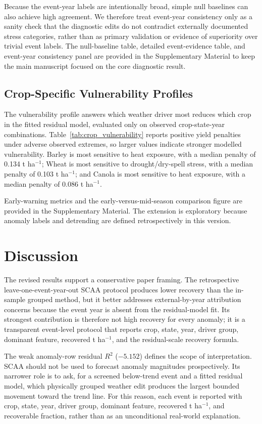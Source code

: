 \documentclass[11pt]{article}
\begin{document}
Because the event-year labels are intentionally broad, simple null baselines can also
achieve high agreement. We therefore treat event-year consistency only as a sanity
check that the diagnostic edits do not contradict externally documented stress
categories, rather than as primary validation or evidence of superiority over trivial
event labels. The null-baseline table, detailed event-evidence table, and event-year
consistency panel are provided in the Supplementary Material to keep the main
manuscript focused on the core diagnostic result.

\subsection{Crop-Specific Vulnerability Profiles}
The vulnerability profile answers which weather driver most reduces which crop in the
fitted residual model, evaluated only on observed crop-state-year combinations.
Table~\ref{tab:crop_vulnerability} reports positive yield penalties under adverse
observed extremes, so larger values indicate stronger modelled vulnerability. Barley
is most sensitive to heat exposure, with a median penalty of 0.134 t ha$^{-1}$; Wheat
is most sensitive to drought/dry-spell stress, with a median penalty of 0.103
t ha$^{-1}$; and Canola is most sensitive to heat exposure, with a median penalty of
0.086 t ha$^{-1}$.



Early-warning metrics and the early-versus-mid-season comparison figure are provided
in the Supplementary Material. The extension is exploratory because anomaly labels
and detrending are defined retrospectively in this version.

\section{Discussion}
The revised results support a conservative paper framing. The retrospective
leave-one-event-year-out SCAA protocol produces lower recovery than the in-sample
grouped method, but it better addresses external-by-year attribution concerns because
the event year is absent from the residual-model fit. Its strongest contribution is
therefore not high recovery for every anomaly; it is a transparent event-level protocol
that reports crop, state, year, driver group, dominant feature, recovered t ha$^{-1}$,
and the residual-scale recovery formula.

The weak anomaly-row residual $R^2$ ($-5.152$) defines the scope of interpretation.
SCAA should not be used to forecast anomaly magnitudes prospectively. Its narrower
role is to ask, for a screened below-trend event and a fitted residual model, which
physically grouped weather edit produces the largest bounded movement toward the
trend line. For this reason, each event is reported with crop, state, year, driver
group, dominant feature, recovered t ha$^{-1}$, and recoverable fraction, rather than
as an unconditional real-world explanation.
\end{document}
